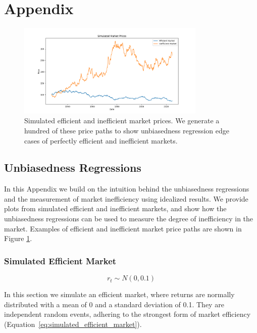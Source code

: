 \section{Appendix}
\label{sec:appendix}

\begin{figure}[h!]
    \centering
    \includegraphics[width=0.8\textwidth]{../figs/Sample_Simulated_Market_Prices.png}
    \caption{Simulated efficient and inefficient market prices. We generate a hundred of these price paths to show
    unbiasedness regression edge cases of perfectly efficient and inefficient markets.}
    \label{fig:sample_simulated_market}
\end{figure}

\subsection{Unbiasedness Regressions}
In this Appendix we build on the intuition behind the unbiasedness regressions and the measurement of market inefficiency using idealized results.
We provide plots from simulated efficient and inefficient markets, and show how the unbiasedness regressions can be used to measure the degree of inefficiency in the market.
Examples of efficient and inefficient market price paths are shown in Figure \ref{fig:sample_simulated_market}.

\subsubsection{Simulated Efficient Market}
\begin{equation}
    r_t \sim N(0, 0.1)
    \label{eq:simulated_efficient_market}
\end{equation}

In this section we simulate an efficient market, where returns are normally distributed with a mean of 0 and a standard deviation of 0.1.
They are independent random events, adhering to the strongest form of market efficiency (Equation~\ref{eq:simulated_efficient_market}).

